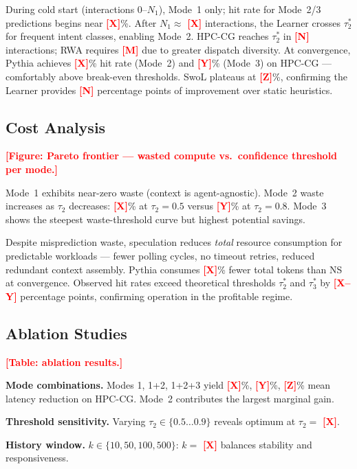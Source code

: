 \documentclass[conference,10pt]{IEEEtran}
\newcommand{\placeholder}[1]{\textcolor{red}{\textbf{[#1]}}}
\begin{document}
During cold start (interactions $0$--$N_1$), Mode~1 only; hit rate for Mode~2/3 predictions begins near \placeholder{X}\%.
After $N_1 \approx$ \placeholder{X} interactions, the Learner crosses $\tau_2^*$ for frequent intent classes, enabling Mode~2.
HPC-CG reaches $\tau_2^*$ in \placeholder{N} interactions; RWA requires \placeholder{M} due to greater dispatch diversity.
At convergence, Pythia achieves \placeholder{X}\% hit rate (Mode~2) and \placeholder{Y}\% (Mode~3) on HPC-CG --- comfortably above break-even thresholds.
SwoL plateaus at \placeholder{Z}\%, confirming the Learner provides \placeholder{N} percentage points of improvement over static heuristics.

\subsection{Cost Analysis}

\placeholder{Figure: Pareto frontier --- wasted compute vs.\ confidence threshold per mode.}

Mode~1 exhibits near-zero waste (context is agent-agnostic). Mode~2 waste increases as $\tau_2$ decreases: \placeholder{X}\% at $\tau_2 = 0.5$ versus \placeholder{Y}\% at $\tau_2 = 0.8$. Mode~3 shows the steepest waste-threshold curve but highest potential savings.

Despite misprediction waste, speculation reduces \emph{total} resource consumption for predictable workloads --- fewer polling cycles, no timeout retries, reduced redundant context assembly. Pythia consumes \placeholder{X}\% fewer total tokens than NS at convergence. Observed hit rates exceed theoretical thresholds $\tau_2^*$ and $\tau_3^*$ by \placeholder{X--Y} percentage points, confirming operation in the profitable regime.

\subsection{Ablation Studies}

\placeholder{Table: ablation results.}

\textbf{Mode combinations.} Modes 1, 1+2, 1+2+3 yield \placeholder{X}\%, \placeholder{Y}\%, \placeholder{Z}\% mean latency reduction on HPC-CG. Mode~2 contributes the largest marginal gain.

\textbf{Threshold sensitivity.} Varying $\tau_2 \in \{0.5 \ldots 0.9\}$ reveals optimum at $\tau_2 =$ \placeholder{X}.

\textbf{History window.} $k \in \{10, 50, 100, 500\}$: $k =$ \placeholder{X} balances stability and responsiveness.
\end{document}
